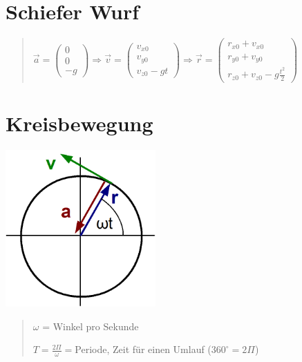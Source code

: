 \section*{Schiefer Wurf}
\begin{verse}
$\vec{a}=\left(\begin{array}{c}
0\\
0\\
-g
\end{array}\right)\Rightarrow\vec{v}=\left(\begin{array}{c}
v_{x0}\\
v_{y0}\\
v_{z0}-gt
\end{array}\right)\Rightarrow\vec{r}=\left(\begin{array}{c}
r_{x0}+v_{x0}\\
r_{y0}+v_{y0}\\
r_{z0}+v_{z0}-g\frac{t^{2}}{2}
\end{array}\right)$
\end{verse}

\section*{Kreisbewegung}

\includegraphics[height=6cm]{Kinetik/Kreisbewegung}
\begin{verse}
$\omega$ = Winkel pro Sekunde

$T=\frac{2\Pi}{\omega}=$Periode, Zeit für einen Umlauf ($360^{\circ}=2\Pi$)
\end{verse}

